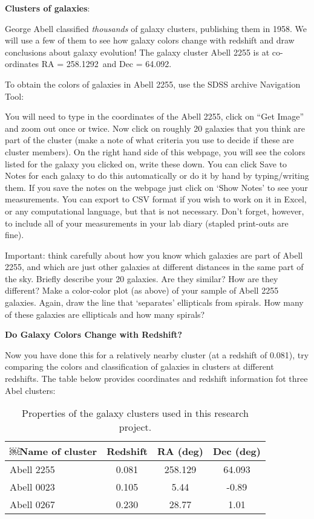 \noindent
{\bf Clusters of galaxies}:

\noindent
George Abell classified \emph{thousands} of galaxy clusters, publishing them in 1958. We will use a few of them to see how galaxy colors change with redshift and draw conclusions about galaxy evolution!
The galaxy cluster Abell 2255 is at co-ordinates RA = 258.1292\deg\  and Dec = 64.092\deg .

\noindent
To obtain the colors of galaxies in Abell 2255, use the SDSS archive Navigation Tool: 


\noindent
You will need to type in the coordinates of the Abell 2255, click on ``Get Image'' and zoom out once or twice. Now click on roughly 20 galaxies that you think are part of the cluster (make a note of what criteria you use to decide if these are cluster members). On the right hand side of this webpage, you will see the colors listed for the galaxy you clicked on, write these down. You can click Save to Notes for each galaxy to do this automatically or do it by hand by typing/writing them. If you save the notes on the webpage just click on ‘Show Notes’ to see your measurements. You can export to CSV format if you wish to work on it in Excel, or any computational language, but that is not necessary.
Don’t forget, however, to include all of your measurements in your lab diary (stapled print-outs are fine).

\noindent
Important: think carefully about how you know which galaxies are part of Abell 2255, and which are just other galaxies at different distances in the same part of the sky. Briefly describe your 20 galaxies. Are they similar? How are they different? Make a color-color plot (as above) of your sample of Abell 2255 galaxies. Again, draw the line that ‘separates’ ellipticals from spirals. How many of these galaxies are ellipticals and how many spirals?



\clearpage

\noindent
{\bf Do Galaxy Colors Change with Redshift?}

\noindent
Now you have done this for a relatively nearby cluster (at a redshift of 0.081), try comparing the colors and classification of galaxies in clusters at different redshifts. The table below provides coordinates and redshift information fot three Abel clusters:

\begin{table}[ht!]
\begin{center}
\begin{tabular}{l c c c}
￼Name of cluster &  Redshift & RA (deg) & Dec (deg)\\\hline
Abell 2255 & 0.081 & 258.129 & 64.093 \\ 
Abell 0023 & 0.105 & 5.44 & -0.89 \\
Abell 0267 & 0.230 & 28.77 & 1.01
\end{tabular}
\end{center}
\caption{ Properties of the galaxy clusters used in this research project.}
\end{table}

